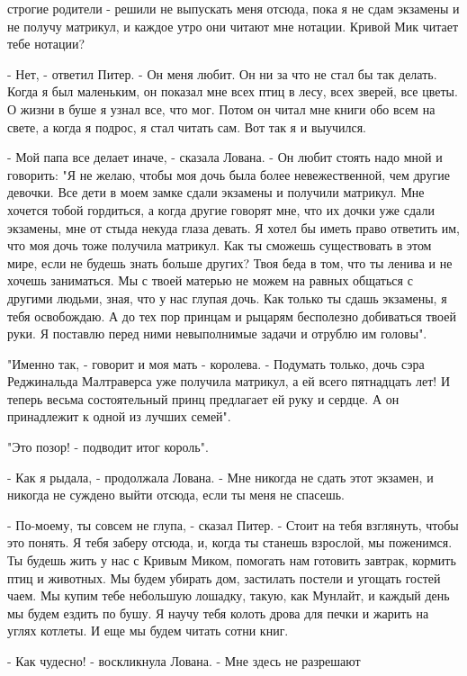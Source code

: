 строгие родители - решили не выпускать меня отсюда, пока я не сдам 
экзамены и не получу матрикул, и каждое утро они читают мне нотации. 
Кривой Мик читает тебе нотации?
\par- Нет, - ответил Питер. - Он меня любит. Он ни за что не стал бы 
так делать. Когда я был маленьким, он показал мне всех птиц в лесу, 
всех зверей, все цветы. О жизни в буше я узнал все, что мог. Потом он 
читал мне книги обо всем на свете, а когда я подрос, я стал читать 
сам. Вот так я и выучился.
\par- Мой папа все делает иначе, - сказала Лована. - Он любит стоять 
надо мной и говорить: "Я не желаю, чтобы моя дочь была более 
невежественной, чем другие девочки. Все дети в моем замке сдали 
экзамены и получили матрикул. Мне хочется тобой гордиться, а когда 
другие говорят мне, что их дочки уже сдали экзамены, мне от стыда 
некуда глаза девать. Я хотел бы иметь право ответить им, что моя дочь 
тоже получила матрикул. Как ты сможешь существовать в этом мире, если 
не будешь знать больше других? Твоя беда в том, что ты ленива и не 
хочешь заниматься. Мы с твоей матерью не можем на равных общаться с 
другими людьми, зная, что у нас глупая дочь. Как только ты сдашь 
экзамены, я тебя освобождаю. А до тех пор принцам и рыцарям бесполезно 
добиваться твоей руки. Я поставлю перед ними невыполнимые задачи и 
отрублю им головы".
\par"Именно так, - говорит и моя мать - королева. - Подумать только, 
дочь сэра Реджинальда Малтраверса уже получила матрикул, а ей всего 
пятнадцать лет! И теперь весьма состоятельный принц предлагает ей руку 
и сердце. А он принадлежит к одной из лучших семей".
\par"Это позор! - подводит итог король".
\par- Как я рыдала, - продолжала Лована. - Мне никогда не сдать этот 
экзамен, и никогда не суждено выйти отсюда, если ты меня не спасешь.
\par- По-моему, ты совсем не глупа, - сказал Питер. - Стоит на тебя 
взглянуть, чтобы это понять. Я тебя заберу отсюда, и, когда ты станешь 
взрослой, мы поженимся. Ты будешь жить у нас с Кривым Миком, помогать 
нам готовить завтрак, кормить птиц и животных. Мы будем убирать дом, 
застилать постели и угощать гостей чаем. Мы купим тебе небольшую 
лошадку, такую, как Мунлайт, и каждый день мы будем ездить по бушу. Я 
научу тебя колоть дрова для печки и жарить на углях котлеты. И еще мы 
будем читать сотни книг.
\par- Как чудесно! - воскликнула Лована. - Мне здесь не разрешают 
